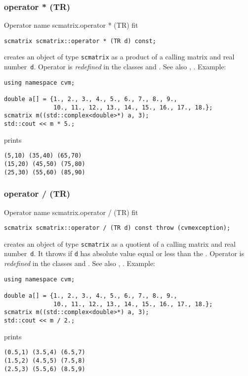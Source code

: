 \subsubsection{operator * (TR)}
Operator%
\pdfdest name {scmatrix.operator * (TR)} fit
\begin{verbatim}
scmatrix scmatrix::operator * (TR d) const;
\end{verbatim}
creates an object of type \verb"scmatrix" as a product of
a calling matrix and  real number~\verb"d".
Operator is \emph{redefined} in the classes
and .
See also ,
.
Example:
\begin{Verbatim}
using namespace cvm;

double a[] = {1., 2., 3., 4., 5., 6., 7., 8., 9.,
              10., 11., 12., 13., 14., 15., 16., 17., 18.};
scmatrix m((std::complex<double>*) a, 3);
std::cout << m * 5.;
\end{Verbatim}
prints
\begin{Verbatim}
(5,10) (35,40) (65,70)
(15,20) (45,50) (75,80)
(25,30) (55,60) (85,90)
\end{Verbatim}
\newpage



\subsubsection{operator / (TR)}
Operator%
\pdfdest name {scmatrix.operator / (TR)} fit
\begin{verbatim}
scmatrix scmatrix::operator / (TR d) const throw (cvmexception);
\end{verbatim}
creates an object of type \verb"scmatrix" as a quotient of
a calling matrix and  real number~\verb"d". It throws
if \verb"d" has  absolute value equal or less than the
.
Operator is \emph{redefined} in the classes
and .
See also ,
.
Example:
\begin{Verbatim}
using namespace cvm;

double a[] = {1., 2., 3., 4., 5., 6., 7., 8., 9.,
              10., 11., 12., 13., 14., 15., 16., 17., 18.};
scmatrix m((std::complex<double>*) a, 3);
std::cout << m / 2.;
\end{Verbatim}
prints
\begin{Verbatim}
(0.5,1) (3.5,4) (6.5,7)
(1.5,2) (4.5,5) (7.5,8)
(2.5,3) (5.5,6) (8.5,9)
\end{Verbatim}
\newpage



